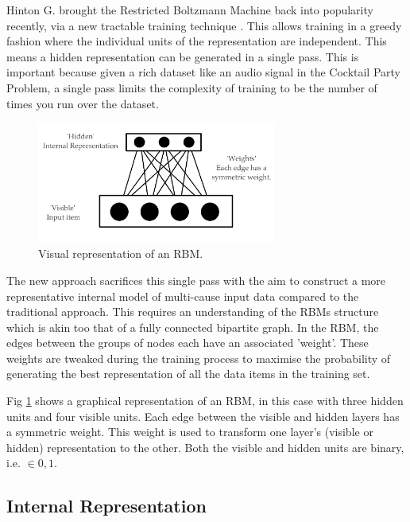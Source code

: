 Hinton G. brought the Restricted Boltzmann Machine back into popularity recently, via a new tractable training technique \cite{Hinton:2006dk}. This allows training in a greedy fashion where the individual units of the representation are independent. This means a hidden representation can be generated in a single pass. This is important because given a rich dataset like an audio signal in the Cocktail Party Problem, a single pass limits the complexity of training to be the number of times you run over the dataset.

\begin{figure}[htbp]
\begin{center}
	\includegraphics[width=0.7\textwidth]{Assets/RBMimage}
\caption{Visual representation of an RBM.}
\label{F:rbm}
\end{center}
\end{figure}

The new approach sacrifices this single pass with the aim to construct a more representative internal model of multi-cause input data compared to the traditional approach. This requires an understanding of the RBMs structure which is akin too that of a fully connected bipartite graph. In the RBM, the edges between the groups of nodes each have an associated 'weight'. These weights are tweaked during the training process to maximise the probability of generating the best representation of all the data items in the training set. 

Fig \ref{F:rbm} shows a graphical representation of an RBM, in this case with three hidden units and four visible units. Each edge between the visible and hidden layers has a symmetric weight. This weight is used to transform one layer's (visible or hidden) representation to the other. Both the visible and hidden units are binary, i.e. $ \in {0,1} $.

\subsection{Internal Representation}\label{SS:repr}

